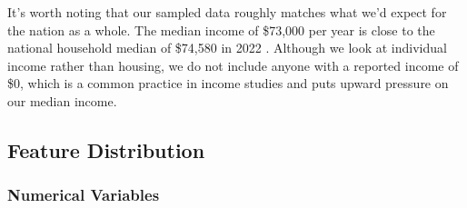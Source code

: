 \documentclass{article}
\newenvironment{custommargins}[2]{%
    \newgeometry{left=#1, right=#2}%
}{%
    \restoregeometry%
}
\begin{document}
It's worth noting that our sampled data roughly matches what we'd expect for the nation as a whole. The median income of 
\$73,000 per year is close to the national household median of \$74,580 in 2022 \cite{census}. Although we look at individual income rather than housing,
we do not include anyone with a reported income of \$0, which is a common practice in income studies and puts upward pressure on our median income.

\begin{custommargins}{2cm}{2cm}
\subsection*{Feature Distribution}
\subsubsection*{Numerical Variables}


\end{custommargins}
\end{document}
